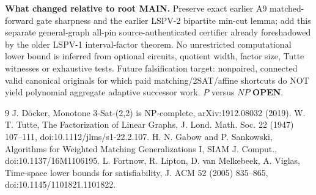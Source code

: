 \documentclass[11pt]{article}
\begin{document}
\noindent\textbf{What changed relative to root MAIN.} Preserve exact earlier A9 matched-forward gate sharpness and the earlier LSPV-2 bipartite min-cut lemma; add this separate general-graph all-pin source-authenticated certifier already foreshadowed by the older LSPV-1 interval-factor theorem. No unrestricted computational lower bound is inferred from optional circuits, quotient width, factor size, Tutte witnesses or exhaustive tests. Future falsification target: nonpaired, connected valid canonical originals for which paid matching/2SAT/affine shortcuts do NOT yield polynomial aggregate adaptive successor work. $P$ versus $NP$ \textbf{OPEN}.

\begin{thebibliography}{9}
 J. D\"ocker, Monotone 3-Sat-(2,2) is NP-complete, arXiv:1912.08032 (2019).
 W. T. Tutte, The Factorization of Linear Graphs, J. Lond. Math. Soc. 22 (1947) 107--111, doi:10.1112/jlms/s1-22.2.107.
 H. N. Gabow and P. Sankowski, Algorithms for Weighted Matching Generalizations I, SIAM J. Comput., doi:10.1137/16M1106195.
 L. Fortnow, R. Lipton, D. van Melkebeek, A. Viglas, Time-space lower bounds for satisfiability, J. ACM 52 (2005) 835--865, doi:10.1145/1101821.1101822.
\end{thebibliography}
\end{document}
